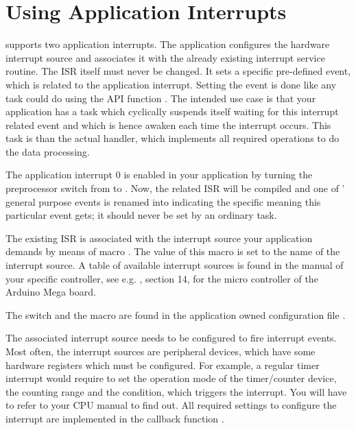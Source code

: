\section{Using Application Interrupts}

\rtos{} supports two application interrupts. The application configures
the hardware interrupt source and associates it with the already existing
interrupt service routine. The ISR itself must never be changed. It sets a
specific pre-defined event, which is related to the application
interrupt. Setting the event is done like any task could do using the API
function . The intended use case is that your
application has a task which cyclically suspends itself waiting for this
interrupt related event and which is hence awaken each time the interrupt
occurs. This task is than the actual handler, which implements all
required operations to do the data processing.

The application interrupt 0 is enabled in your application by turning the
preprocessor switch  from
 to . Now, the related
ISR will be compiled and one of \rtos{}' general purpose events is renamed
into  indicating the specific
meaning this particular event gets; it should never be set by an ordinary
task.

The existing ISR is associated with the interrupt source your application
demands by means of macro . The value of this
macro is set to the name of the interrupt source. A table of available
interrupt sources is found in the manual of your specific controller, see
e.g. , section 14, for the micro controller of the Arduino Mega
board.

The switch  and the macro
 are found in the application owned
configuration file .

The associated interrupt source needs to be configured to fire interrupt
events. Most often, the interrupt sources are peripheral devices, which
have some hardware registers which must be configured. For example, a
regular timer interrupt would require to set the operation mode of the
timer/counter device, the counting range and the condition, which triggers
the interrupt. You will have to refer to your CPU manual to find out. All
required settings to configure the interrupt are implemented in the
callback function .

